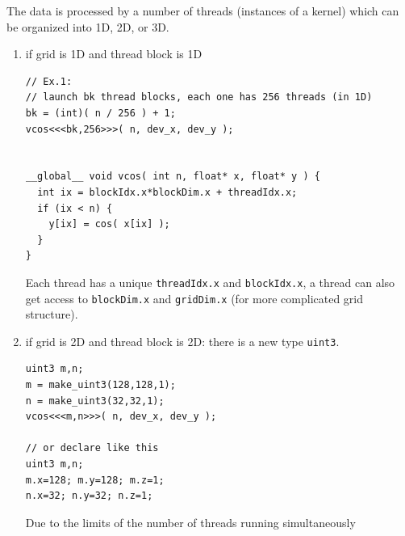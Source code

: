 The data is processed by a number of threads (instances of a kernel)
which can be organized into 1D, 2D, or 3D.
\begin{enumerate}
\item if grid is 1D and thread block is 1D
\begin{lstlisting}
// Ex.1: 
// launch bk thread blocks, each one has 256 threads (in 1D)
bk = (int)( n / 256 ) + 1;
vcos<<<bk,256>>>( n, dev_x, dev_y );


__global__ void vcos( int n, float* x, float* y ) {
  int ix = blockIdx.x*blockDim.x + threadIdx.x;
  if (ix < n) {
    y[ix] = cos( x[ix] );
  }
}
\end{lstlisting}
Each thread has a unique \verb!threadIdx.x! and \verb!blockIdx.x!, a
thread can also get access to \verb!blockDim.x! and \verb!gridDim.x!
(for more complicated grid structure).

\item if grid is 2D and thread block is 2D: there is a new type
  \verb!uint3!. 
\begin{lstlisting}
uint3 m,n;
m = make_uint3(128,128,1);
n = make_uint3(32,32,1);
vcos<<<m,n>>>( n, dev_x, dev_y );

// or declare like this
uint3 m,n;
m.x=128; m.y=128; m.z=1;
n.x=32; n.y=32; n.z=1;
\end{lstlisting}

Due to the limits of the number of threads running simultaneously
\end{enumerate}

